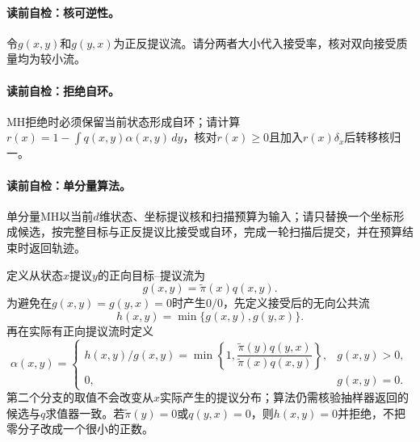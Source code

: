 \paragraph{读前自检：\MetropolisHastings{}核可逆性。}令$g(x,y)$和$g(y,x)$为正反提议流。请分两者大小代入接受率，核对双向接受质量均为较小流。\par

\paragraph{读前自检：\MetropolisHastings{}拒绝自环。}MH拒绝时必须保留当前状态形成自环；请计算$r(x)=1-\int q(x,y)\alpha(x,y)\,dy$，核对$r(x)\ge0$且加入$r(x)\delta_x$后转移核归一。\par
\paragraph{读前自检：单分量\MetropolisHastings{}算法。}单分量MH以当前$d$维状态、坐标提议核和扫描预算为输入；请只替换一个坐标形成候选，按完整目标与正反提议比接受或自环，完成一轮扫描后提交，并在预算结束时返回轨迹。\par


定义从状态$x$提议$y$的正向目标--提议流为
\begin{equation}\label{eq:V5-C03-directed-flow}
g(x,y)=\widetilde\pi(x)q(x,y).
\end{equation}
为避免在$g(x,y)=g(y,x)=0$时产生$0/0$，先定义接受后的无向公共流
\begin{equation}\label{eq:V5-C03-common-flow}
h(x,y)=\min\{g(x,y),g(y,x)\}.
\end{equation}
再在实际有正向提议流时定义
\begin{equation}\label{eq:V5-C03-mh-alpha}
\alpha(x,y)=
\begin{cases}
h(x,y)/g(x,y)
=\min\!\left\{1,
\dfrac{\widetilde\pi(y)q(y,x)}
{\widetilde\pi(x)q(x,y)}\right\},&g(x,y)>0,\\[1.1em]
0,&g(x,y)=0.
\end{cases}
\end{equation}
第二个分支的取值不会改变从$x$实际产生的提议分布；算法仍需核验抽样器返回的候选与$q$求值器一致。若$\widetilde\pi(y)=0$或$q(y,x)=0$，则$h(x,y)=0$并拒绝，不把零分子改成一个很小的正数。

